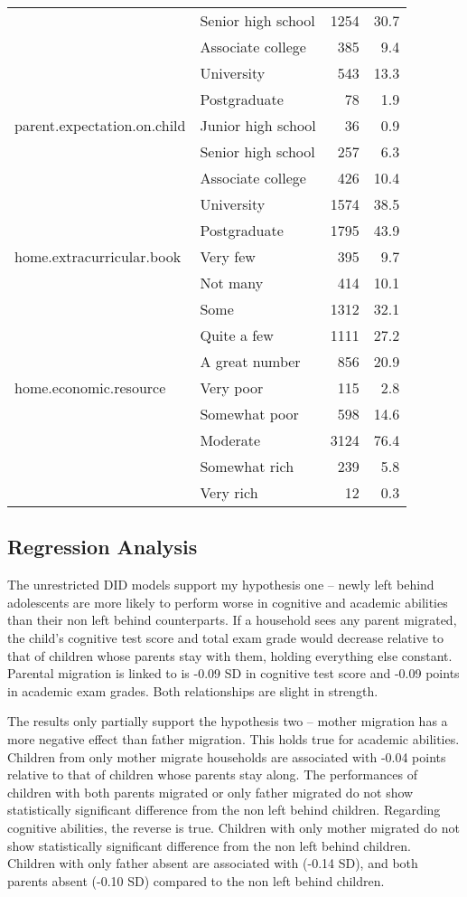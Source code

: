 \documentclass[
  man,floatsintext]{apa7}
\begin{document}
\begin{longtable}[]{@{}llrr@{}}
& Senior high school & 1254 & 30.7 \\
& Associate college & 385 & 9.4 \\
& University & 543 & 13.3 \\
& Postgraduate & 78 & 1.9 \\
parent.expectation.on.child & Junior high school & 36 & 0.9 \\
& Senior high school & 257 & 6.3 \\
& Associate college & 426 & 10.4 \\
& University & 1574 & 38.5 \\
& Postgraduate & 1795 & 43.9 \\
home.extracurricular.book & Very few & 395 & 9.7 \\
& Not many & 414 & 10.1 \\
& Some & 1312 & 32.1 \\
& Quite a few & 1111 & 27.2 \\
& A great number & 856 & 20.9 \\
home.economic.resource & Very poor & 115 & 2.8 \\
& Somewhat poor & 598 & 14.6 \\
& Moderate & 3124 & 76.4 \\
& Somewhat rich & 239 & 5.8 \\
& Very rich & 12 & 0.3 \\
\bottomrule
\end{longtable}

\hypertarget{regression-analysis}{%
\subsection{Regression Analysis}\label{regression-analysis}}

The unrestricted DID models support my hypothesis one -- newly left behind adolescents are more likely to perform worse in cognitive and academic abilities than their non left behind counterparts. If a household sees any parent migrated, the child's cognitive test score and total exam grade would decrease relative to that of children whose parents stay with them, holding everything else constant. Parental migration is linked to is -0.09 SD in cognitive test score and -0.09 points in academic exam grades. Both relationships are slight in strength.

The results only partially support the hypothesis two -- mother migration has a more negative effect than father migration. This holds true for academic abilities. Children from only mother migrate households are associated with -0.04 points relative to that of children whose parents stay along. The performances of children with both parents migrated or only father migrated do not show statistically significant difference from the non left behind children. Regarding cognitive abilities, the reverse is true. Children with only mother migrated do not show statistically significant difference from the non left behind children. Children with only father absent are associated with (-0.14 SD), and both parents absent (-0.10 SD) compared to the non left behind children.
\end{document}
